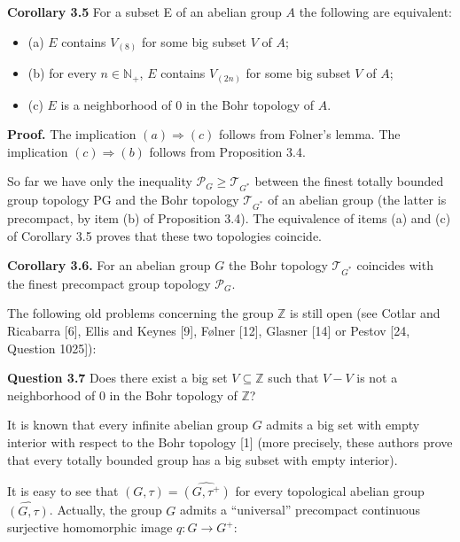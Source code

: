 \documentclass[12pt]{article}
\begin{document}
\textbf{Corollary 3.5} For a subset E of an abelian group $A$ the following are equivalent:


    \begin{itemize}
            
        \item (a) $E$ contains $V_{(8)}$ for some big subset $V$ of $A$;
        
        \item (b) for every $n \in \mathbb{N}_+$, $E$ contains $V_{(2n)}$ for some big subset $V$ of $A$;

        \item (c) $E$ is a neighborhood of 0 in the Bohr topology of $A$.

    \end{itemize}


\textbf{Proof.} The implication $(a) \Rightarrow (c)$ follows from Folner's lemma. The implication $(c) \Rightarrow (b)$ follows from Proposition 3.4.


    So far we have only the inequality $\mathcal{P}_G \geqslant \mathcal{T}_{G^*}$ between the finest totally bounded group topology PG and the Bohr
topology $\mathcal{T}_{G^*}$ of an abelian group (the latter is precompact, by item (b) of Proposition 3.4). The equivalence of items (a)
and (c) of Corollary 3.5 proves that these two topologies coincide.


\textbf{Corollary 3.6.} For an abelian group $G$ the Bohr topology $\mathcal{T}_{G^*}$ coincides with the finest precompact group topology $\mathcal{P}_G$.


    The following old problems concerning the group $\mathbb{Z}$ is still open (see Cotlar and Ricabarra [6], Ellis and Keynes [9],
Følner [12], Glasner [14] or Pestov [24, Question 1025]):


\textbf{Question 3.7} Does there exist a big set $V \subseteq \mathbb{Z}$ such that $V - V$ is not a neighborhood of 0 in the Bohr topology of $\mathbb{Z}$?


    It is known that every infinite abelian group $G$ admits a big set with empty interior with respect to the Bohr topology [1]
(more precisely, these authors prove that every totally bounded group has a big subset with empty interior).


    It is easy to see that $\widehat{(G, \tau)} = \widehat{(G, \tau^+)}$ for every topological abelian group $\widehat{(G, \tau)}$. Actually, the group $G$ admits a
“universal” precompact continuous surjective homomorphic image $q : G \to G^+$:
\end{document}
